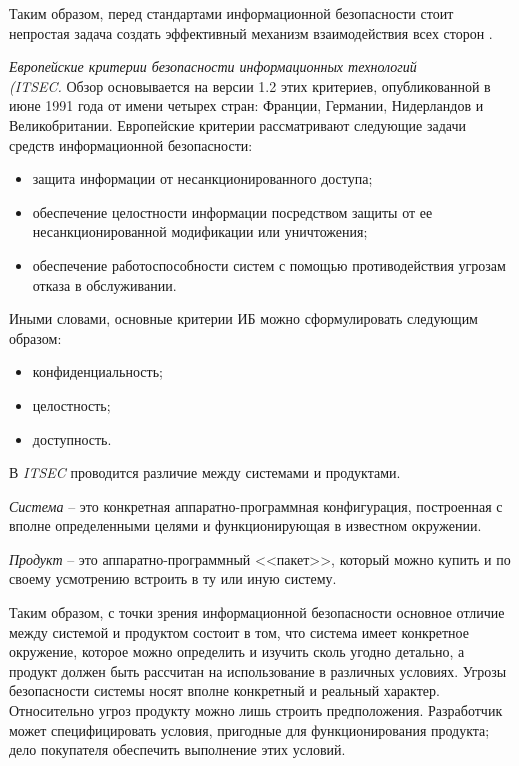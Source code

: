 Таким образом, перед стандартами информационной безопасности стоит непростая задача создать эффективный механизм взаимодействия всех сторон \cite{vostrezova_ural}.

\textit{Европейские критерии безопасности информационных технологий\\(ITSEC.}
Обзор основывается на версии 1.2 этих критериев, опубликованной в июне 1991 года от имени четырех стран: Франции, Германии, Нидерландов и Великобритании.
Европейские критерии рассматривают следующие задачи средств информационной безопасности:
\begin{itemize}
	\item защита информации от несанкционированного доступа;
	\item обеспечение целостности информации посредством защиты от ее несанкционированной модификации или уничтожения;
	\item обеспечение работоспособности систем с помощью противодействия угрозам отказа в обслуживании.
\end{itemize}

Иными словами, основные критерии ИБ можно сформулировать следующим образом:
\begin{itemize}
	\item конфиденциальность;
	\item целостность;
	\item доступность.
\end{itemize}

В \textit{ITSEC} проводится различие между системами и продуктами.

\textit{Система} -- это конкретная аппаратно-программная конфигурация, построенная с вполне определенными целями и функционирующая в известном окружении.

\textit{Продукт} -- это аппаратно-программный <<пакет>>, который можно купить и по своему усмотрению встроить в ту или иную систему.

Таким образом, с точки зрения информационной безопасности основное отличие между системой и продуктом состоит в том, что система имеет конкретное окружение, которое можно определить и изучить сколь угодно детально, а продукт должен быть рассчитан на использование в различных условиях.
Угрозы безопасности системы носят вполне конкретный и реальный характер. Относительно угроз продукту можно лишь строить предположения. Разработчик может специфицировать условия, пригодные для функционирования продукта; дело покупателя обеспечить выполнение этих условий.
